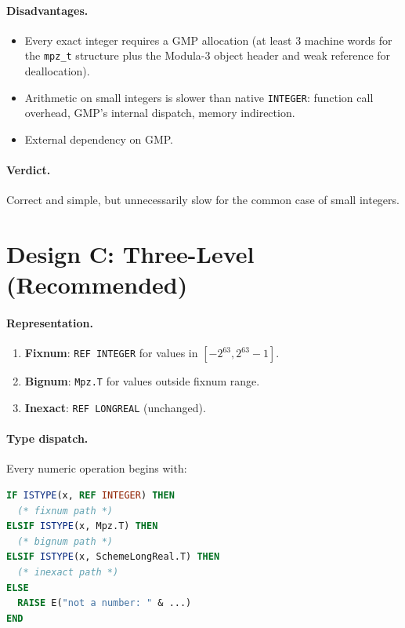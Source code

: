 \documentclass[12pt]{report}
\begin{document}
\paragraph{Disadvantages.}
\begin{itemize}
\item Every exact integer requires a GMP allocation (at least 3
  machine words for the {\tt mpz\_t} structure plus the Modula-3
  object header and weak reference for deallocation).
\item Arithmetic on small integers is slower than native {\tt INTEGER}:
  function call overhead, GMP's internal dispatch, memory indirection.
\item External dependency on GMP.
\end{itemize}

\paragraph{Verdict.}
Correct and simple, but unnecessarily slow for the common case
of small integers.

\section{Design C: Three-Level (Recommended)}
\label{sec:three-level}

\paragraph{Representation.}
\begin{enumerate}
\item \textbf{Fixnum}: {\tt REF INTEGER} for values in
  $[-2^{63}, 2^{63}-1]$.
\item \textbf{Bignum}: {\tt Mpz.T} for values outside fixnum range.
\item \textbf{Inexact}: {\tt REF LONGREAL} (unchanged).
\end{enumerate}

\paragraph{Type dispatch.}
Every numeric operation begins with:
\begin{lstlisting}[language=Modula3]
IF ISTYPE(x, REF INTEGER) THEN
  (* fixnum path *)
ELSIF ISTYPE(x, Mpz.T) THEN
  (* bignum path *)
ELSIF ISTYPE(x, SchemeLongReal.T) THEN
  (* inexact path *)
ELSE
  RAISE E("not a number: " & ...)
END
\end{lstlisting}
\end{document}

